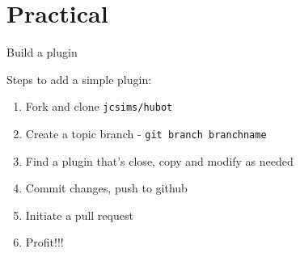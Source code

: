 \documentclass{beamer}
\begin{document}
\section{Practical}

\begin{frame}{Build a plugin}

Steps to add a simple plugin:
\begin{enumerate}
  \item Fork and clone \texttt{jcsims/hubot}
  \pause
  \item Create a topic branch - \texttt{git branch branchname}
  \pause
  \item Find a plugin that's close, copy and modify as needed
  \pause
  \item Commit changes, push to github
  \pause
  \item Initiate a pull request
  \pause
  \item Profit!!!
\end{enumerate}

\end{frame}
\end{document}
